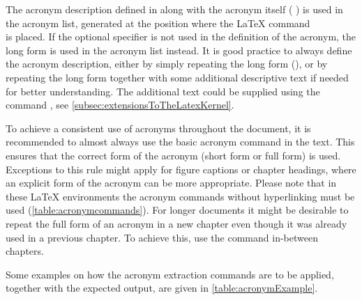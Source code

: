 The acronym description defined in  along with the
acronym itself (\IE{} )
is used in the acronym list, generated at the position where the \LaTeX{} command \\
\latexcmd{\printglossary[type=acronym]} is placed. If the optional
 specifier is not used in the definition of the
acronym, the long form is used in the acronym list instead. It is good
practice to always define the acronym description, either by simply
repeating the long form (), or by repeating the long
form together with some additional descriptive text if needed for better
understanding. The additional text could be supplied using the command
, see
\autoref{subsec:extensionsToTheLatexKernel}.

To achieve a consistent use of acronyms throughout the document, it is
recommended to almost always use the basic acronym command
 in the text. This ensures that the correct form
of the acronym (short form or full form) is used. Exceptions to this rule
might apply \EG{} for figure captions or chapter headings, where an
explicit form of the acronym can be more appropriate. Please note that in
these \LaTeX{} environments the acronym commands without hyperlinking must
be used (\autoref{table:acronymcommands}). For longer documents it might be
desirable to repeat the full form of an acronym in a new chapter even
though it was already used in a previous chapter. To achieve this, use the
\latexcmd{\glsresetall} command in-between chapters.

Some examples on how the acronym extraction commands are to be applied,
together with the expected output, are given in
\autoref{table:acronymExample}.


